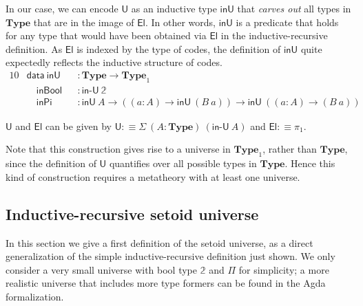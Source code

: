 \documentclass[autoref]{llncs}
\newcommand{\inU}{\mathsf{inU}}
\newcommand{\mType}{\mathbf{Type}}
\newcommand{\U}{\textsf{U}}
\newcommand{\El}{\textsf{El}}
\providecommand\mathbbm{\mathbb}
\begin{document}
In our case, we can encode $\U$ as an inductive type $\inU$ that
\emph{carves out} all types in $\mType$ that are in the image of $\El$. In other
words, $\inU$ is a predicate that holds for any type that would have been
obtained via $\El$ in the inductive-recursive definition. As $\El$ is indexed by
the type of codes, the definition of $\inU$ quite expectedly reflects the
inductive structure of codes.
\vspace{-0.2em}
\begin{alignat*}{10}
  & \textsf{data}\ \inU && : \mType \to \mType_1 \\
  & \quad \textsf{inBool} && : \textsf{in-U}\ \mathbbm{2} \\
  & \quad \textsf{inPi} && :  \inU\ A \to ((a : A) \to \inU\ (B\ a)) \to \inU\ ((a : A) \to (B\ a))
\end{alignat*}

$\U$ and $\El$ can be given by $\U :\equiv \Sigma\ (A : \mType)\ (\textsf{in-U}\ A)$ and $\El :\equiv \pi_1$.

Note that this construction gives rise to a universe in $\mType_1$, rather than
$\mType$, since the definition of $\U$ quantifies over all possible types in
$\mType$. Hence this kind of construction requires a metatheory with at least
one universe.

\subsection{Inductive-recursive setoid universe}\label{ir-setoid-universe}

In this section we give a first definition of the setoid universe, as a direct
generalization of the simple inductive-recursive definition just shown. We only
consider a very small universe with bool type $\mathbbm{2}$ and $\Pi$ for
simplicity; a more realistic universe that includes more type formers
can be found in the Agda formalization.
\end{document}
